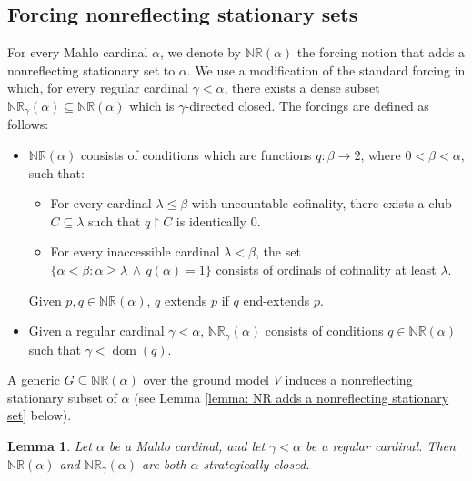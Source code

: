\documentclass[11pt]{amsart}
\renewcommand{\restriction}{\mathbin\upharpoonright}    %
\newtheorem{lemma}[theorem]{Lemma}
\theoremstyle{definition}
\newcounter{condition}
\theoremstyle{remark}
\newcommand\<{{<}}
\newcommand{\dom}{\mathop{\mathrm{dom}}\nolimits}
\begin{document}
\subsection{Forcing nonreflecting stationary sets}\label{Section: Forcing NR}

    For every Mahlo cardinal $\alpha$, we denote by $\mathbb{NR}(\alpha)$ the forcing notion that adds a nonreflecting stationary set to $\alpha$. We use a modification of the standard forcing in which, for every regular cardinal $\gamma<\alpha$, there exists a dense subset $\mathbb{NR}_\gamma(\alpha)\subseteq \mathbb{NR}(\alpha)$ which is $\gamma$-directed closed. The forcings are defined as follows:
    \begin{itemize}
        \item $\mathbb{NR}(\alpha)$ consists of conditions which are functions $q\colon \beta\to 2$, where $0<\beta<\alpha$, such that:
        \begin{itemize}
            \item For every cardinal  $\lambda\leq \beta$ with uncountable cofinality, there exists a club $C\subseteq \lambda$ such that $q\restriction C$ is identically $0$. 
            \item {For every inaccessible cardinal $\lambda<\beta$, the set $\{\alpha<\beta: \alpha\geq \lambda\,\wedge\, q(\alpha)=1\}$ consists of ordinals of cofinality at least $\lambda$}.
        \end{itemize}
        
        Given $p,q \in \mathbb{NR}(\alpha)$, $q$ extends $p$ if $q$ end-extends $p$.
        \item Given a regular cardinal $\gamma<\alpha$,  $\mathbb{NR}_\gamma(\alpha)$ consists of conditions $q\in \mathbb{NR}(\alpha)$ such that $\gamma<\dom(q)$.
    \end{itemize}
    
    A generic $G\subseteq \mathbb{NR}(\alpha)$ over the ground model $V$ induces a nonreflecting stationary subset of $\alpha$ (see Lemma \ref{lemma: NR adds a nonreflecting stationary set} below).


   
   \begin{lemma} \label{Claim: NR is uniformly strategically closed}
       Let $\alpha$ be a Mahlo cardinal, and let  $\gamma<\alpha$ be a regular cardinal. Then $\mathbb{NR}(\alpha)$ and $\mathbb{NR}_{\gamma}(\alpha)$ are both $\alpha$-strategically closed.
   \end{lemma} 
\end{document}
